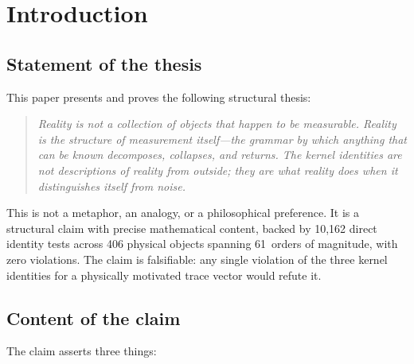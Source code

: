 \documentclass[
  aps,
  prd,
  twocolumn,
  superscriptaddress,
  nofootinbib,
  floatfix
]{revtex4-2}
\begin{document}
\maketitle

\section{Introduction}\label{sec:intro}

\subsection{Statement of the thesis}

This paper presents and proves the following structural thesis:

\begin{quote}
\emph{Reality is not a collection of objects that happen to be
measurable.  Reality is the structure of measurement itself---the
grammar by which anything that can be known decomposes, collapses, and
returns.  The kernel identities are not descriptions of reality from
outside; they are what reality does when it distinguishes itself from
noise.}
\end{quote}

This is not a metaphor, an analogy, or a philosophical preference.
It is a structural claim with precise mathematical content, backed by
10{,}162 direct identity tests across 406 physical objects spanning
61~orders of magnitude, with zero violations.  The claim is
falsifiable: any single violation of the three kernel identities for
a physically motivated trace vector would refute it.

\subsection{Content of the claim}

The claim asserts three things:
\end{document}
